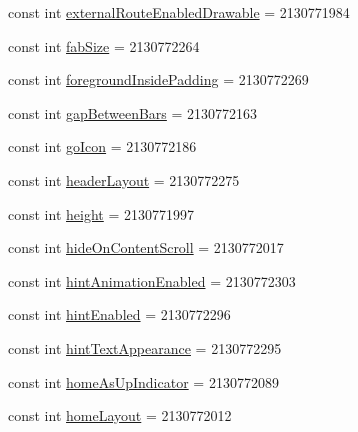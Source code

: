 \begin{DoxyCompactItemize}
\item 
const int \mbox{\hyperlink{class_f_w_p_s___app_1_1_droid_1_1_resource_1_1_attribute_a306e8bd2134197eb81d907bacec5b241}{external\+Route\+Enabled\+Drawable}} = 2130771984
\item 
const int \mbox{\hyperlink{class_f_w_p_s___app_1_1_droid_1_1_resource_1_1_attribute_a0d355cee8a503aca839d7daa91437d83}{fab\+Size}} = 2130772264
\item 
const int \mbox{\hyperlink{class_f_w_p_s___app_1_1_droid_1_1_resource_1_1_attribute_ae39ee76f15fb31a0634c0911c0bbeca8}{foreground\+Inside\+Padding}} = 2130772269
\item 
const int \mbox{\hyperlink{class_f_w_p_s___app_1_1_droid_1_1_resource_1_1_attribute_af649c6cae001537c76e18c386b2d89c3}{gap\+Between\+Bars}} = 2130772163
\item 
const int \mbox{\hyperlink{class_f_w_p_s___app_1_1_droid_1_1_resource_1_1_attribute_a5c2a5bf3801350b31d90ad4a612a4047}{go\+Icon}} = 2130772186
\item 
const int \mbox{\hyperlink{class_f_w_p_s___app_1_1_droid_1_1_resource_1_1_attribute_a7051fb5f4c0597c5775625d9c0efc48e}{header\+Layout}} = 2130772275
\item 
const int \mbox{\hyperlink{class_f_w_p_s___app_1_1_droid_1_1_resource_1_1_attribute_a993cb0a799a19cb21c622fdadfa487d5}{height}} = 2130771997
\item 
const int \mbox{\hyperlink{class_f_w_p_s___app_1_1_droid_1_1_resource_1_1_attribute_a8477ce584e152f484277ed15566352ca}{hide\+On\+Content\+Scroll}} = 2130772017
\item 
const int \mbox{\hyperlink{class_f_w_p_s___app_1_1_droid_1_1_resource_1_1_attribute_a00db25adc53ce55c551281cef55f3137}{hint\+Animation\+Enabled}} = 2130772303
\item 
const int \mbox{\hyperlink{class_f_w_p_s___app_1_1_droid_1_1_resource_1_1_attribute_a8c40d5fbe10b9ab882a11c36c5d7d5c8}{hint\+Enabled}} = 2130772296
\item 
const int \mbox{\hyperlink{class_f_w_p_s___app_1_1_droid_1_1_resource_1_1_attribute_a67c7914916bcc547c9b91d0a60925e7d}{hint\+Text\+Appearance}} = 2130772295
\item 
const int \mbox{\hyperlink{class_f_w_p_s___app_1_1_droid_1_1_resource_1_1_attribute_ad934b006baa0a35f254dfa18c461be80}{home\+As\+Up\+Indicator}} = 2130772089
\item 
const int \mbox{\hyperlink{class_f_w_p_s___app_1_1_droid_1_1_resource_1_1_attribute_ad766d99e79bcbf7e3e26e9914722e72b}{home\+Layout}} = 2130772012

\end{DoxyCompactItemize}
